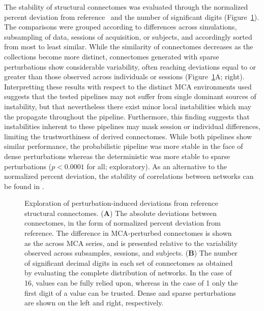 \documentclass[10pt,letterpaper]{article}
\begin{document}
The stability of structural connectomes was evaluated through the normalized percent
deviation from reference~\cite{Kiar2020-lb} and the number of significant digits
(Figure~\ref{fig:absolute}). The comparisons were grouped according to differences
across simulations, subsampling of data, sessions of acquisition, or subjects, and
accordingly sorted from most to least similar. While the similarity of connectomes
decreases as the collections become more distinct, connectomes generated with sparse
perturbations show considerable variability, often reaching deviations equal to or
greater than those observed across individuals or sessions
(Figure~\ref{fig:absolute}A; right). Interpretting these results with respect to the
distinct MCA environments used suggests that the tested pipelines may not suffer from
single dominant sources of instability, but that nevertheless there exist minor local
instabilities which may the propagate throughout the pipeline. Furthermore, this
finding suggests that instabilities inherent to these pipelines may mask session or
individual differences, limiting the trustworthiness of derived connectomes. While
both pipelines show similar performance, the probabilistic pipeline was more stable
in the face of dense perturbations whereas the deterministic was more stable to
sparse perturbations ($p < 0.0001$ for all; exploratory). As an alternative to the
normalized percent deviation, the stability of correlations between networks can be
found in .

\begin{figure}[hbt]\centering
\caption{Exploration of perturbation-induced deviations from reference structural
connectomes. (\textbf{A}) The absolute deviations between connectomes, in the form of
normalized percent deviation from reference. The difference in MCA-perturbed
connectomes is shown as the across MCA series, and is presented relative to the
variability observed across subsamples, sessions, and subjects. (\textbf{B}) The
number of significant decimal digits in each set of connectomes as obtained by
evaluating the complete distribution of networks. In the case of 16, values can be
fully relied upon, whereas in the case of 1 only the first digit of a value can be
trusted. Dense and sparse perturbations are shown on the left and right, respectively.}
\label{fig:absolute}
\end{figure}
\end{document}
